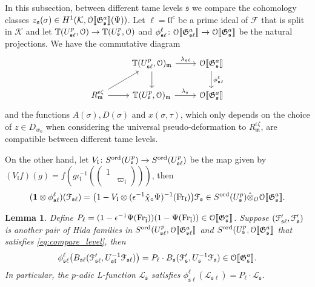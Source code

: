 \documentclass[leqno]{amsart}
\newtheorem{lem}[thm]{Lemma}
\theoremstyle{definition}
\theoremstyle{remark}
\newcommand{\smat}[1]{\left(\begin{smallmatrix} #1 \end{smallmatrix}\right)}
\newcommand{\id}{\mathbf{1}}
\newcommand{\eo}{\EuScript{O}}
\newcommand{\Fr}{\textnormal{Fr}} %
\newcommand{\fl}{\mathfrak{l}}
\newcommand{\fm}{\mathfrak{m}}
\newcommand{\fn}{\mathfrak{n}}
\newcommand{\fs}{\mathfrak{s}}
\newcommand{\F}{{\mathcal{F}}} %
\newcommand{\K}{{\mathcal{K}}} %
\newcommand{\fG}{\mathfrak{G}}
\newcommand{\TT}{\mathbb{T}} %
\newcommand{\euF}{\EuScript{F}} %
\newcommand{\ord}{\textnormal{ord}} %
\begin{document}
In this subsection,
between different tame levels $\fs$
we compare the cohomology classes 
$z_\fs(\sigma)\in H^1(\K,\eo\llbracket\fG_\fs^a\rrbracket(\Psi))$.
Let $\ell=\fl\fl^c$ be a prime ideal of $\F$
that is split in $\K$
and let $\TT(U^p_{\fs\ell},\eo)\to \TT(U^p_{\fs},\eo)$
and $\phi_{\fs\ell}^\ell\colon 
\eo\llbracket\fG_{\fs\ell}^a\rrbracket\to
\eo\llbracket\fG_\fs^a\rrbracket$
be the natural projections.
We have the commutative diagram
\[
\begin{tikzcd}
	& \TT(U^p_{\fs\ell},\eo)_\fm\arrow[d] \arrow[r,"\lambda_{\fs\ell}"]
    &\eo\llbracket\fG_\fs^a\rrbracket \arrow[d,"\phi_{\fn\ell}^\ell"]\\
	R_{\fm}^{\epsilon\zeta}\arrow[r]\arrow[ur]
	& \TT(U^p_\fs,\eo)_\fm \arrow[r,"\lambda_\fs"] &
    \eo\llbracket\fG_\fs^a\rrbracket
\end{tikzcd}
\]
and the functions $A(\sigma), D(\sigma)$
and $x(\sigma,\tau)$,
which only depends on the choice of $z\in D_{w_0}$
when considering the universal pseudo-deformation
to $R_\fm^{\epsilon\zeta}$,
are compatible between different tame levels.

On the other hand, let 
$V_\fl\colon S^{\ord}(U^p_\fs)\to S^{\ord}(U^p_{\fs\ell})$
be the map given by 
$(V_\fl f)(g)=f(g\iota_\fl^{-1}(\smat{1&\\&\varpi_\fl}))$,
then
\begin{equation}\label{eq:compare_level}
    (\id\otimes\phi^\ell_{\fs\ell})(\euF_{\fs\ell})=
	\big(1-V_\fl\otimes(\epsilon^{-1}\hat{\chi}_\circ\Psi)^{-1}(\Fr_\fl)\big)
	\euF_{\fs}
    \in S^{\ord}(U^p_\fs)\hat{\otimes}_\eo
        \eo\llbracket \fG_\fs^a\rrbracket.
\end{equation}


\begin{lem}\label{lem:compare_L_diff_level}
Define 
$P_\ell=(1-\epsilon^{-1}\Psi(\Fr_{\bar{\fl}}))
(1-\Psi(\Fr_{\bar{\fl}}))\in
\eo\llbracket\fG_\fs^a\rrbracket$.
Suppose $(\euF'_{\fs\ell}, \euF'_\fs)$ 
is another pair of Hida families in 
$S^{\ord}(U^p_{\fs\ell},\eo\llbracket\fG_{\fs\ell}^a\rrbracket$ and
$S^{\ord}(U^p_{\fs},\eo\llbracket\fG_{\fs}^a\rrbracket$ 
that satisfies \eqref{eq:compare_level}, then
\[
	\phi_{\fs\ell}^\ell
    \big(B_{\fs\ell}(\euF'_{\fs\ell}, U_{\fs\fl}^{-1}\euF_{\fs\ell})\big)=
	P_\ell\cdot B_{\fs}(\euF'_{\fs}, U_\fs^{-1}\euF_{\fs})
    \in \eo\llbracket\fG_\fs^a\rrbracket.
\]
In particular, 
the $p$-adic L-function $\mathcal{L}_\fs$ satisfies 
$\phi_{\fs\ell}^\ell(\mathcal{L}_{\fs\ell})=
P_\ell\cdot \mathcal{L}_\fs$.
\end{lem}
\end{document}
